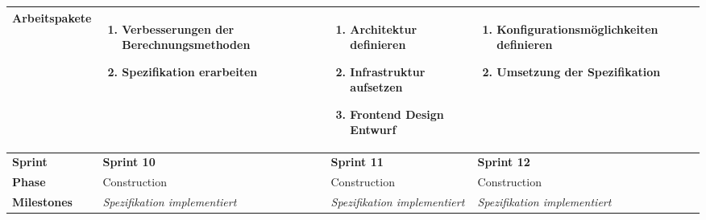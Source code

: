 \begin{landscape}
\begin{longtable}{l p{5.5cm} p{5.5cm} p{5.5cm}}
        \textbf{Arbeitspakete}
                                & \begin{enumerate}[noitemsep]
                                    \item Verbesserungen der Berechnungsmethoden
                                    \item Spezifikation erarbeiten
                                \end{enumerate}
                                & \begin{enumerate}[noitemsep]
                                    \item Architektur definieren
                                    \item Infrastruktur aufsetzen
                                    \item Frontend Design Entwurf
                                \end{enumerate}
                                & \begin{enumerate}[noitemsep]
                                    \item Konfigurationsmöglichkeiten definieren
                                    \item Umsetzung der Spezifikation
                                \end{enumerate} \\

        \toprule
        \textbf{Sprint}
                                & \textbf{Sprint 10}
                                & \textbf{Sprint 11}
                                & \textbf{Sprint 12} \\

        \midrule
        \textbf{Phase}
                                & Construction
                                & Construction
                                & Construction \\

        \textbf{Milestones}
                                & \textit{Spezifikation implementiert}
                                & \textit{Spezifikation implementiert}
                                & \textit{Spezifikation implementiert}  \\


\end{longtable}
\end{landscape}
